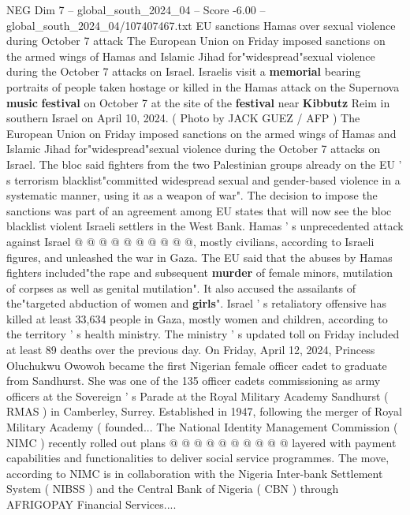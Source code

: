 \begin{textsample}{NEG Dim 7 – global\_south\_2024\_04 – Score -6.00 – global\_south\_2024\_04/107407467.txt}  \label{ex:f7_neg_344}
EU sanctions Hamas over sexual violence during October 7 attack The European Union on Friday imposed sanctions on the armed wings of Hamas and Islamic Jihad for"widespread"sexual violence during the October 7 attacks on Israel.
Israelis visit a \textbf{memorial} bearing portraits of people taken hostage or killed in the Hamas attack on the Supernova \textbf{music} \textbf{festival} on October 7 at the site of the \textbf{festival} near \textbf{Kibbutz} Reim in southern Israel on April 10, 2024. ( Photo by JACK GUEZ / AFP ) The European Union on Friday imposed sanctions on the armed wings of Hamas and Islamic Jihad for"widespread"sexual violence during the October 7 attacks on Israel.
The bloc said fighters from the two Palestinian groups already on the EU ' s terrorism blacklist"committed widespread sexual and gender-based violence in a systematic manner, using it as a weapon of war".
The decision to impose the sanctions was part of an agreement among EU states that will now see the bloc blacklist violent Israeli settlers in the West Bank.
Hamas ' s unprecedented attack against Israel @ @ @ @ @ @ @ @ @ @, mostly civilians, according to Israeli figures, and unleashed the war in Gaza.
The EU said that the abuses by Hamas fighters included"the rape and subsequent \textbf{murder} of female minors, mutilation of corpses as well as genital mutilation".
It also accused the assailants of the"targeted abduction of women and \textbf{girls}".
Israel ' s retaliatory offensive has killed at least 33,634 people in Gaza, mostly women and children, according to the territory ' s health ministry.
The ministry ' s updated toll on Friday included at least 89 deaths over the previous day.
On Friday, April 12, 2024, Princess Oluchukwu Owowoh became the first Nigerian female officer cadet to graduate from Sandhurst.
She was one of the 135 officer cadets commissioning as army officers at the Sovereign ' s Parade at the Royal Military Academy Sandhurst ( RMAS ) in Camberley, Surrey.
Established in 1947, following the merger of Royal Military Academy ( founded...
The National Identity Management Commission ( NIMC ) recently rolled out plans @ @ @ @ @ @ @ @ @ @ layered with payment capabilities and functionalities to deliver social service programmes.
The move, according to NIMC is in collaboration with the Nigeria Inter-bank Settlement System ( NIBSS ) and the Central Bank of Nigeria ( CBN ) through AFRIGOPAY Financial Services....

\end{textsample}
